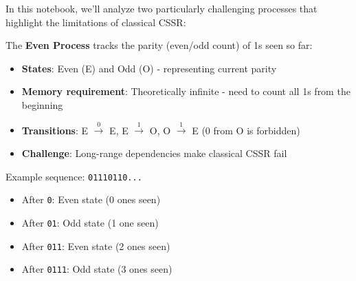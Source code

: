 \documentclass[11pt]{article}
\begin{document}
In this notebook, we'll analyze two particularly challenging processes that highlight the limitations of classical CSSR:

\begin{resultbox}
The \textbf{Even Process} tracks the parity (even/odd count) of 1s seen so far:
\begin{itemize}
\item \textbf{States}: Even (E) and Odd (O) - representing current parity
\item \textbf{Memory requirement}: Theoretically infinite - need to count all 1s from the beginning
\item \textbf{Transitions}: E $\xrightarrow{0}$ E, E $\xrightarrow{1}$ O, O $\xrightarrow{1}$ E (0 from O is forbidden)
\item \textbf{Challenge}: Long-range dependencies make classical CSSR fail
\end{itemize}

Example sequence: \texttt{01110110...}
\begin{itemize}
\item After \texttt{0}: Even state (0 ones seen)
\item After \texttt{01}: Odd state (1 one seen)
\item After \texttt{011}: Even state (2 ones seen)
\item After \texttt{0111}: Odd state (3 ones seen)
\end{itemize}

\begin{center}
\end{center}
\end{resultbox}
\end{document}
